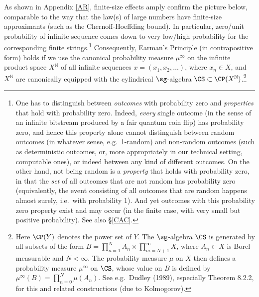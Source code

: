 \documentclass[12pt]{article}
\numberwithin{equation}{section}
\newcommand{\x}{\times}
\newcommand{\N}{{\mathbb N}} \newcommand{\R}{{\mathbb R}}
\begin{document}
 As shown in Appendix \ref{AR}, finite-size effects amply confirm the picture below, comparable to the way that
 the law(s) of large numbers have finite-size approximants (such as the Chernoff-Hoeffding bound). In particular, zero/unit probability of  infinite sequence comes down to very low/high  probability for the corresponding finite strings.\footnote{One has to  distinguish between \emph{outcomes} with probability zero and \emph{properties} that hold with probability zero. Indeed, \emph{every} single outcome (in the sense of an infinite bitstream produced by a fair quantum coin flip) has probability zero, and hence this property alone cannot distinguish between random outcomes (in whatever sense, e.g.\ 1-random) and non-random outcomes (such as deterministic outcomes, or, more appropriately in our technical setting, computable ones), or indeed between any kind of different outcomes. On the other hand, not being random is a \emph{property} that holds with probability zero, in that the \emph{set} of all outcomes that are not random has probability zero (equivalently, the event consisting of all outcomes that are random happens almost surely, i.e.\ with probability 1). And yet outcomes with this probability zero property exist and may occur (in the finite case, with very small but positive probability).
 See also \S\ref{CAC}.}
 Consequently, Earman's Principle (in contrapositive form) holds  if we use the canonical probability measure $\mu^{\infty}$ on the 
  infinite product space $X^{\N}$ of all infinite sequences $x=(x_1, x_2, \ldots)$, where $x_n\in X$, 
  and $X^{\N}$ are canonically equipped with the cylindrical  $\sg$-algebra $\CS\subset \CP(X^{\N})$.\footnote{\label{sigma}
Here $\CP(Y)$ denotes the power set of $Y$. The $\sg$-algebra $\CS$ is generated by all subsets of the form 
$B= \prod_{n=1}^N A_n\x \prod_{m=N+1}^{\infty} X$,
where  $A_n\subset X $ is Borel measurable and $N<\infty$. The probability measure $\mu$ on $X$ then defines a probability measure $\mu^{\infty}$ on $\CS$, whose value  on  $B$ is defined by
$\mu^{\infty}(B)=\prod_{n=0}^N \mu(A_n)$. See e.g.\ Dudley (1989), especially Theorem 8.2.2, for this and related constructions (due to Kolmogorov). }
\end{document}
